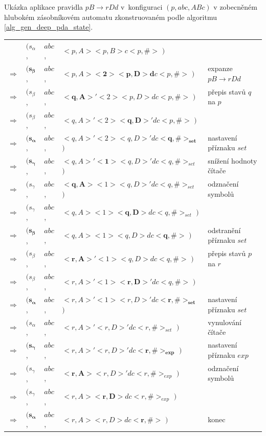 \begin{Example}
Ukázka aplikace pravidla $pB \rightarrow r Dd$ v~konfiguraci $(p, abc, ABc)$ v zobecněném hlubokém zásobníkovém automatu zkonstruovaném podle algoritmu \ref{alg_gen_deep_pda_state}.

\begin{center}
\begin{tabular}{llll|l}
                & $( s_{\alpha}$,  & $abc$, & $<p,A> <p,B> c <p, \#>$         $)$ &  \\
$\Rightarrow$   & $( \mathbf{s_{\beta}}$,   & $abc$, & $<p,A> \mathbf{<2> <p,D> d} c <p, \#>$         $)$ & expanze $pB \rightarrow r Dd$ \\
$\Rightarrow$   & $( s_{\beta}$,   & $abc$, & $\mathbf{<q,A>'} <2> <p,D> d c <p, \#>$         $)$ & přepis stavů $q$ na $p$\\
$\Rightarrow$   & $( s_{\beta}$,   & $abc$, & $<q,A>' <2> \mathbf{<q,D>'} d c <p, \#>$         $)$ & \\
$\Rightarrow$   & $( \mathbf{s_{\alpha}}$,   & $abc$, & $<q,A>' <2> <q,D>' d c \mathbf{<q, \#>_{set}}$         $)$ & nastavení příznaku $set$\\
$\Rightarrow$   & $( \mathbf{s_{\gamma}}$,  & $abc$, & $<q,A>' \mathbf{<1>} <q,D>' d c <q, \#>_{set}$  $)$ & snížení hodnoty čítače \\
$\Rightarrow$   & $( s_{\gamma}$,  & $abc$, & $\mathbf{<q,A>} <1> <q,D>' d c <q, \#>_{set}$  $)$ & odznačení symbolů \\
$\Rightarrow$   & $( s_{\gamma}$,  & $abc$, & $<q,A> <1> \mathbf{<q,D>} d c <q, \#>_{set}$  $)$ &  \\
$\Rightarrow$   & $( \mathbf{s_{\beta}}$,  & $abc$, & $<q,A> <1> <q,D> d c \mathbf{<q, \#>}$  $)$ &  odstranění příznaku $set$\\
$\Rightarrow$   & $( s_{\beta}$,  & $abc$, & $\mathbf{<r,A>'} <1> <q,D> d c <q, \#>$  $)$ &  přepis stavů $p$ na $r$\\
$\Rightarrow$   & $( s_{\beta}$,  & $abc$, & $<r,A>' <1> \mathbf{<r,D>'} d c <q, \#>$  $)$ &  \\
$\Rightarrow$   & $( \mathbf{s_{\alpha}}$,  & $abc$, & $<r,A>' <1> <r,D>' d c \mathbf{<r, \#>_{set}}$  $)$ &  nastavení příznaku $set$\\
$\Rightarrow$   & $( s_{\alpha}$,  & $abc$, & $<r,A>' <r,D>' d c <r, \#>_{set}$  $)$ &  vynulování čítače\\
$\Rightarrow$   & $( \mathbf{s_{\gamma}}$,  & $abc$, & $<r,A>' <r,D>' d c \mathbf{<r, \#>_{exp}}$  $)$ &  nastavení příznaku $exp$\\
$\Rightarrow$   & $( s_{\gamma}$,  & $abc$, & $\mathbf{<r,A>} <r,D>' d c <r, \#>_{exp}$  $)$ &  odznačení symbolů\\
$\Rightarrow$   & $( s_{\gamma}$,  & $abc$, & $<r,A> \mathbf{<r,D>} d c <r, \#>_{exp}$  $)$ &  \\
$\Rightarrow$   & $( \mathbf{s_{\alpha}}$,  & $abc$, & $<r,A> <r,D> d c \mathbf{<r, \#>}$  $)$ &  konec

\end{tabular}
\end{center}


\end{Example}


